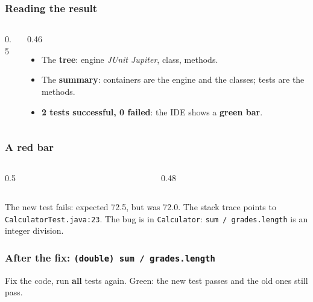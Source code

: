 \documentclass[aspectratio=169,10pt,compress]{beamer}
\begin{document}
\begin{frame}[t,fragile] \frametitle{Reading the result}
  \begin{columns}[T]
    \begin{column}{0.5\textwidth}
    \end{column}
    \begin{column}{0.46\textwidth}
      \begin{itemize}\small
        \item The \textbf{tree}: engine \emph{JUnit Jupiter}, class, methods.
        \item The \textbf{summary}: containers are the engine and the classes; tests are the methods.
        \item \textbf{2 tests successful, 0 failed}: the IDE shows a \textbf{green bar}.
      \end{itemize}
    \end{column}
  \end{columns}
\end{frame}




\begin{frame}[t,fragile] \frametitle{A red bar}
  \begin{columns}[T]
    \begin{column}{0.5\textwidth}
    \end{column}
    \begin{column}{0.48\textwidth}
    \end{column}
  \end{columns}

  \vspace{0.2em}
  \small The new test fails: expected 72.5, but was 72.0. The stack trace points to \texttt{CalculatorTest.java:23}.
  The bug is in \texttt{Calculator}: \texttt{sum / grades.length} is an integer division.
\end{frame}




\begin{frame}[t,fragile] \frametitle{After the fix: \texttt{(double) sum / grades.length}}

  \vspace{0.1em}
  \small
  Fix the code, run \textbf{all} tests again. Green: the new test passes and the old ones still pass.
\end{frame}
\end{document}
